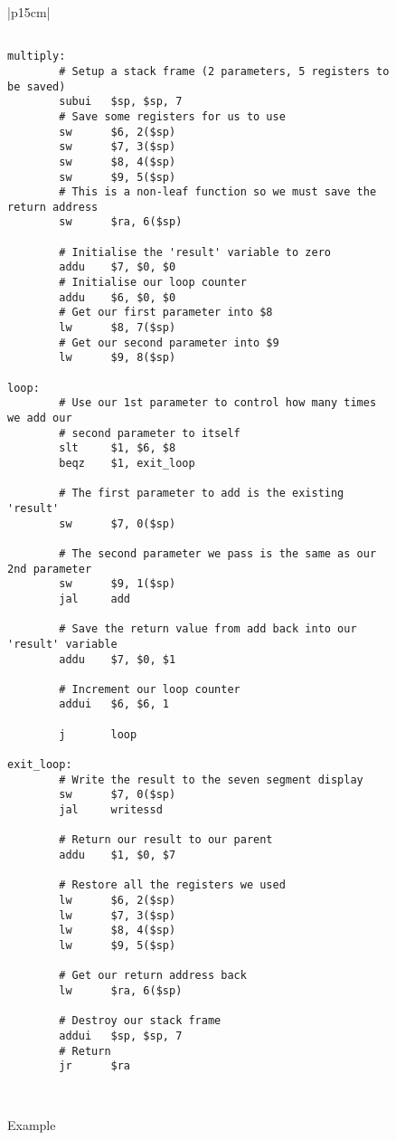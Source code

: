 %
%
\begin{figure}[!hbtp]
\begin{footnotesize}
\begin{center}
\begin{tabular}{|p{15cm}|}
\hline
\begin{verbatim}

multiply:
        # Setup a stack frame (2 parameters, 5 registers to be saved)
        subui   $sp, $sp, 7
        # Save some registers for us to use
        sw      $6, 2($sp)
        sw      $7, 3($sp)
        sw      $8, 4($sp)
        sw      $9, 5($sp)
        # This is a non-leaf function so we must save the return address
        sw      $ra, 6($sp)

        # Initialise the 'result' variable to zero
        addu    $7, $0, $0
        # Initialise our loop counter
        addu    $6, $0, $0
        # Get our first parameter into $8
        lw      $8, 7($sp)
        # Get our second parameter into $9
        lw      $9, 8($sp)

loop:
        # Use our 1st parameter to control how many times we add our
        # second parameter to itself
        slt     $1, $6, $8
        beqz    $1, exit_loop

        # The first parameter to add is the existing 'result'
        sw      $7, 0($sp)

        # The second parameter we pass is the same as our 2nd parameter
        sw      $9, 1($sp)
        jal     add

        # Save the return value from add back into our 'result' variable
        addu    $7, $0, $1

        # Increment our loop counter
        addui   $6, $6, 1

        j       loop

exit_loop:
        # Write the result to the seven segment display
        sw      $7, 0($sp)
        jal     writessd

        # Return our result to our parent
        addu    $1, $0, $7

        # Restore all the registers we used
        lw      $6, 2($sp)
        lw      $7, 3($sp)
        lw      $8, 4($sp)
        lw      $9, 5($sp)

        # Get our return address back
        lw      $ra, 6($sp)

        # Destroy our stack frame
        addui   $sp, $sp, 7
        # Return
        jr      $ra

\end{verbatim}
\\
\hline
\end{tabular}
\end{center}
\end{footnotesize}

\caption{Example}
\label{stack_example}
\end{figure}
